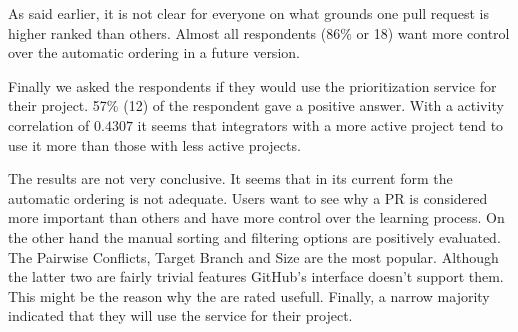 As said earlier, it is not clear for everyone on what grounds one pull request is higher ranked than others.
Almost all respondents (86\% or 18) want more control over the automatic ordering in a future version.

Finally we asked the respondents if they would use the prioritization service for their project.
57\% (12) of the respondent gave a positive answer.
With a activity correlation of $0.4307$ it seems that integrators with a more active project tend to use it more than those with less active projects.

The results are not very conclusive.
It seems that in its current form the automatic ordering is not adequate.
Users want to see why a PR is considered more important than others and have more control over the learning process.
On the other hand the manual sorting and filtering options are positively evaluated.
The Pairwise Conflicts, Target Branch and Size are the most popular.
Although the latter two are fairly trivial features GitHub's interface doesn't support them.
This might be the reason why the are rated usefull.
Finally, a narrow majority indicated that they will use the service for their project.
